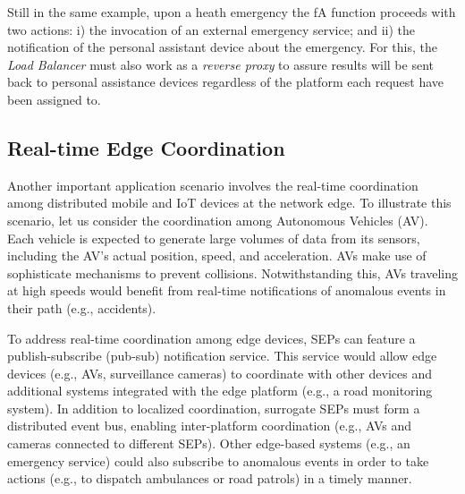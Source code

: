 Still in the same example, upon a heath emergency the fA function proceeds with two actions: i) the invocation of an external emergency service; and ii) the notification of the personal assistant device about the emergency. For this, the \textit{Load Balancer} must also work as a \textit{reverse proxy} to assure results will be sent back to personal assistance devices regardless of the platform each request have been assigned to.




\subsection{Real-time Edge Coordination}\label{sec:SEP_RTEC}


Another important application scenario involves the real-time coordination among distributed mobile and IoT devices at the network edge. To illustrate this scenario, let us consider the coordination among Autonomous Vehicles (AV). Each vehicle is expected to generate large volumes of data from its sensors, including the AV's actual position, speed, and acceleration. AVs make use of sophisticate mechanisms to prevent collisions. Notwithstanding this, AVs traveling at high speeds would benefit from real-time notifications of anomalous events in their path (e.g., accidents). 

To address real-time coordination among edge devices, SEPs can feature a publish-subscribe (pub-sub) notification service. This service would allow edge devices (e.g., AVs, surveillance cameras) to coordinate with other devices and additional systems integrated with the edge platform (e.g., a road monitoring system). In addition to localized coordination, surrogate SEPs must form a distributed event bus, enabling inter-platform coordination (e.g., AVs and cameras connected to different SEPs). Other edge-based systems (e.g., an emergency service) could also subscribe to anomalous events in order to take actions (e.g., to dispatch ambulances or road patrols) in a timely manner.

